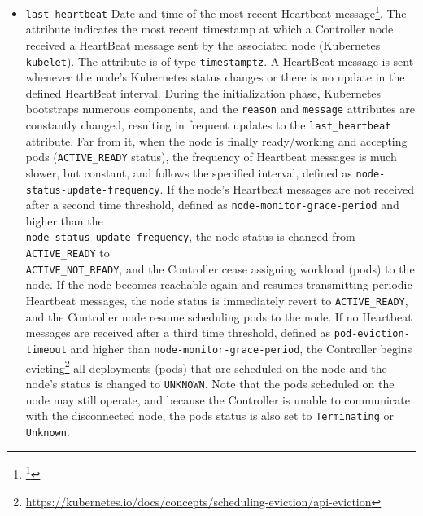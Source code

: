 \begin{itemize}
  \item \texttt{last\_heartbeat}
    \newline
    Date and time of the most recent Heartbeat message\footnote{\footnote{\url{https://kubernetes.io/docs/concepts/architecture/nodes/\#heartbeats}}}.
    \newline
    The attribute indicates the most recent timestamp at which a Controller node
    received a HeartBeat message sent by the associated node (Kubernetes \texttt{kubelet}).
    The attribute is of type \texttt{timestamptz}.
    \newline
    A HeartBeat message is sent whenever the node's Kubernetes status changes or
    there is no update in the defined HeartBeat interval. During the initialization
    phase, Kubernetes bootstraps numerous components, and the \texttt{reason}
    and \texttt{message} attributes are constantly changed, resulting in
    frequent updates to the \texttt{last\_heartbeat} attribute. Far from it, when
    the node is finally ready/working and accepting pods (\texttt{ACTIVE\_READY}
    status), the frequency of Heartbeat messages is much slower, but constant, and
    follows the specified interval, defined as \texttt{node-status-update-frequency}.
    If the node's Heartbeat messages are not received after a second time
    threshold, defined as \texttt{node-monitor-grace-period} and higher than the
    \\ %
    \texttt{node-status-update-frequency}, the node status is changed from \texttt{ACTIVE\_READY}
    to \\ %
    \texttt{ACTIVE\_NOT\_READY}, and the Controller cease assigning workload (pods)
    to the node. If the node becomes reachable again and resumes transmitting
    periodic Heartbeat messages, the node status is immediately revert to \texttt{ACTIVE\_READY},
    and the Controller node resume scheduling pods to the node. If no Heartbeat
    messages are received after a third time threshold, defined as \texttt{pod-eviction-timeout}
    and higher than \texttt{node-monitor-grace-period}, the Controller begins
    evicting\footnote{\url{https://kubernetes.io/docs/concepts/scheduling-eviction/api-eviction}}
    all deployments (pods) that are scheduled on the node and the node's status
    is changed to \texttt{UNKNOWN}. Note that the pods scheduled on the node may
    still operate, and because the Controller is unable to communicate with the disconnected
    node, the pods status is also set to \texttt{Terminating} or \texttt{Unknown}.
    \newline

\end{itemize}
